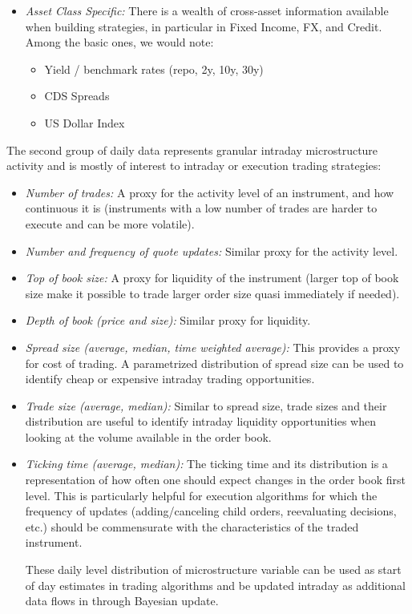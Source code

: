 \begin{itemize}
\item \emph{Asset Class Specific:} There is a wealth of cross-asset information available when building strategies, in particular in Fixed Income, FX, and Credit. Among the basic ones, we would note:
        \begin{itemize}
        \item Yield / benchmark rates (repo, 2y, 10y, 30y)
        \item CDS Spreads
        \item US Dollar Index
        \end{itemize}
\end{itemize}


The second group of daily data represents granular intraday microstructure activity and is mostly of interest to intraday or execution trading strategies:
        \begin{itemize}
        \item \emph{Number of trades:} A proxy for the activity level of an instrument, and how continuous it is (instruments with a low number of trades are harder to execute and can be more volatile). 
        
        \item \emph{Number and frequency of quote updates:} Similar proxy for the activity level.
        
        \item \emph{Top of book size:} A proxy for liquidity of the instrument (larger top of book size make it possible to trade larger order size quasi immediately if needed).
        
        \item \emph{Depth of book (price and size):} Similar proxy for liquidity.
        
        \item \emph{Spread size (average, median, time weighted average):} This provides a proxy for cost of trading. A parametrized distribution of spread size can be used to identify cheap or expensive intraday trading opportunities.
        
        \item \emph{Trade size (average, median):} Similar to spread size, trade sizes and their distribution are useful to identify intraday liquidity opportunities when looking at the volume available in the order book.
        
        \item \emph{Ticking time (average, median):} The ticking time and its distribution is a representation of how often one should expect changes in the order book first level. This is particularly helpful for execution algorithms for which the frequency of updates (adding/canceling child orders, reevaluating decisions, etc.) should be commensurate with the characteristics of the traded instrument.
        
        These daily level distribution of microstructure variable can be used as start of day estimates in trading algorithms and be updated intraday as additional data flows in through Bayesian update.
        \end{itemize}


